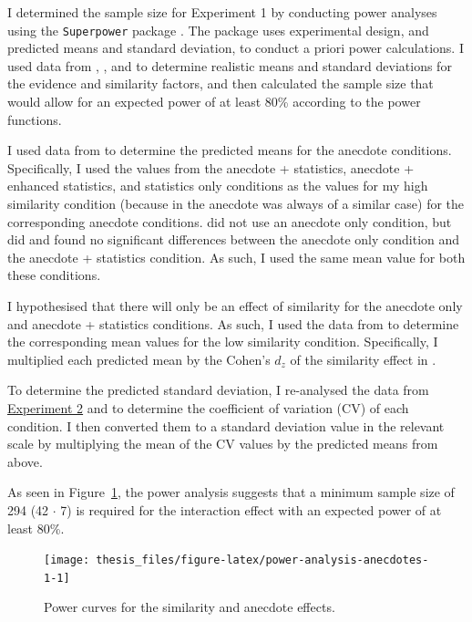 \documentclass[a4paper, nobind, dvipsnames]{templates/ociamthesis}
\theoremstyle{definition}
\theoremstyle{definition}
\theoremstyle{definition}
\theoremstyle{definition}
\theoremstyle{remark}
\begin{document}
I determined the sample size for Experiment 1 by conducting power analyses using
the \texttt{Superpower} package \autocite{lakens2019}. The package uses experimental design,
and predicted means and standard deviation, to conduct a priori power
calculations. I used data from \textcite{wainberg2018}, \textcite{jaramillo2019}, and \textcite[Study 3]{hoeken2009} to determine realistic means and standard deviations for the evidence
and similarity factors, and then calculated the sample size that would allow for
an expected power of at least 80\% according to the power functions.

I used data from \textcite{wainberg2018} to determine the predicted means for the anecdote
conditions. Specifically, I used the values from the anecdote + statistics,
anecdote + enhanced statistics, and statistics only conditions as the values for
my high similarity condition (because in \textcite{wainberg2018} the anecdote was always
of a similar case) for the corresponding anecdote conditions. \textcite{wainberg2018} did
not use an anecdote only condition, but \textcite{wainberg2013} did and found no
significant differences between the anecdote only condition and the anecdote +
statistics condition. As such, I used the same mean value for both these
conditions.

I hypothesised that there will only be an effect of similarity for the anecdote
only and anecdote + statistics conditions. As such, I used the data from
\textcite[Study 3]{hoeken2009} to determine the corresponding mean values for the low
similarity condition. Specifically, I multiplied each predicted mean by the
Cohen's \(d_z\) of the similarity effect in \textcite[Study 3]{hoeken2009}.

To determine the predicted standard deviation, I re-analysed the data from
\textcite{jaramillo2019} \protect\hyperlink{anecdotes-2-appendix}{Experiment 2} and \textcite[Study 3]{hoeken2009} to determine the
coefficient of variation (CV) of each condition. I then converted them to a
standard deviation value in the relevant scale by multiplying the mean of the CV
values by the predicted means from above.

As seen in Figure~\ref{fig:power-analysis-anecdotes-1}, the power analysis
suggests that a minimum sample size of 294
(42 \(\cdot\) 7) is required for the interaction effect with
an expected power of at least 80\%.



\begin{figure}
\texttt{[image: thesis\_files/figure-latex/power-analysis-anecdotes-1-1]} \caption{Power curves for the similarity and anecdote effects.}\label{fig:power-analysis-anecdotes-1}
\end{figure}
\end{document}
